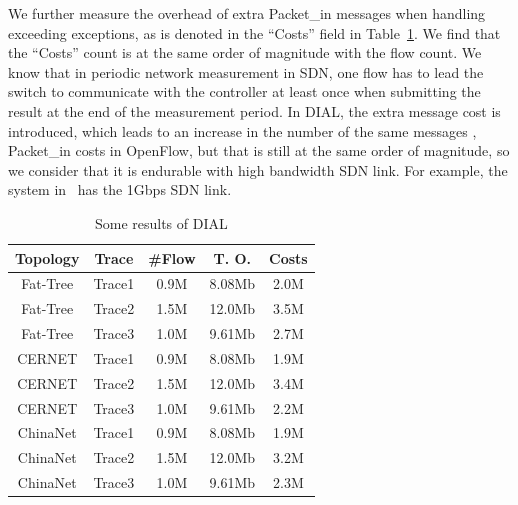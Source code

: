 We further measure the overhead of extra Packet\_in messages when handling exceeding exceptions, as is denoted in the ``Costs'' field in Table~\ref{tab:result}.
We find that the ``Costs'' count is at the same order of magnitude with the flow count.
We know that in periodic network measurement in SDN, one flow has to lead the switch to communicate with the controller at least once when submitting the result at the end of the measurement period.
In DIAL, the extra message cost is introduced, which leads to an increase in the number of the same messages \eg, Packet\_in costs in OpenFlow, but that is still at the same order of magnitude, so we consider that it is endurable with high bandwidth SDN link. For example, the system in~\cite{Liu2017} has the 1Gbps SDN link.

\begin{table}[t]\small
 \caption{Some results of DIAL}
  \label{tab:result}
  \centering
  \begin{tabular}{ccccc}
    \toprule
    Topology & Trace  & \#Flow & T. O.  & Costs\\
    \midrule
    Fat-Tree & Trace1 & 0.9M   & 8.08Mb & 2.0M \\
    Fat-Tree & Trace2 & 1.5M  & 12.0Mb & 3.5M \\
    Fat-Tree & Trace3 & 1.0M  & 9.61Mb & 2.7M \\
    CERNET   & Trace1 & 0.9M   & 8.08Mb & 1.9M \\
    CERNET   & Trace2 & 1.5M  & 12.0Mb & 3.4M \\
    CERNET   & Trace3 & 1.0M  & 9.61Mb & 2.2M \\
    ChinaNet & Trace1 & 0.9M   & 8.08Mb & 1.9M \\
    ChinaNet & Trace2 & 1.5M  & 12.0Mb & 3.2M \\
    ChinaNet & Trace3 & 1.0M  & 9.61Mb & 2.3M \\
    \bottomrule
  \end{tabular}
  \vspace{-2ex}
\end{table}
